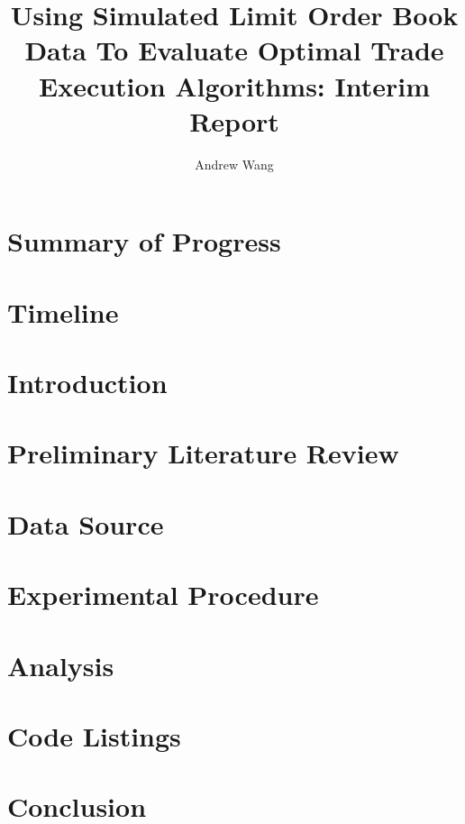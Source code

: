 \documentclass[12pt,lot,lol,lof]{puthesis_undergraduate}
\title{Using Simulated Limit Order Book Data To Evaluate Optimal Trade Execution Algorithms: Interim Report}
\author{Andrew Wang}
\begin{document}
\chapter{Summary of Progress}\label{ch:progress}


\chapter{Timeline}


\chapter{Introduction}\label{ch:intro}  %

\chapter{Preliminary Literature Review}\label{ch:litreview}


\chapter{Data Source}\label{ch:data_source}


\chapter{Experimental Procedure}\label{ch:experiment}


\chapter{Analysis}


\chapter{Code Listings}


\chapter{Conclusion}



 \label{bib}
\end{document}
